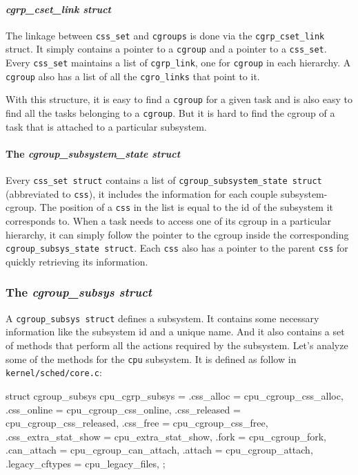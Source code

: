 \paragraph{\textit{cgrp\_cset\_link struct}}
The linkage between \verb|css_set| and \verb|cgroups| is done via the \verb|cgrp_cset_link| struct. It simply contains a pointer to a \verb|cgroup| and a pointer to a \verb|css_set|. Every \verb|css_set| maintains a list of \verb|cgrp_link|, one for \verb|cgroup| in each hierarchy. A \verb|cgroup| also has a list of all the \verb|cgro_links| that point to it. 

With this structure, it is easy to find a \verb|cgroup| for a given task and is also easy to find all the tasks belonging to a \verb|cgroup|. But it is hard to find the cgroup of a task that is attached to a particular subsystem.

\paragraph{The \textit{cgroup\_subsystem\_state struct}}
Every \verb|css_set struct| contains a list of \verb|cgroup_subsystem_state struct| (abbreviated to \verb|css|), it includes the information for each couple subsystem-cgroup.
The position of a \verb|css| in the list is equal to the id of the subsystem it corresponds to. When a task needs to access one of its cgroup in a particular hierarchy, it can simply follow the pointer to the cgroup inside the corresponding \verb|cgroup_subsys_state struct|. Each \verb|css| also has a pointer to the parent \verb|css| for quickly retrieving its information.

\subsubsection{The \textit{cgroup\_subsys struct}}
A \verb|cgroup_subsys struct| defines a subsystem. It contains some necessary information like the subsystem id and a unique name. And it also contains a set of methods that perform all the actions required by the subsystem. Let's analyze some of the methods for the \verb|cpu| subsystem. It is defined as follow in \verb|kernel/sched/core.c|:
\begin{code}
struct cgroup_subsys cpu_cgrp_subsys = {
	.css_alloc	= cpu_cgroup_css_alloc,
	.css_online	= cpu_cgroup_css_online,
	.css_released	= cpu_cgroup_css_released,
	.css_free	= cpu_cgroup_css_free,
	.css_extra_stat_show = cpu_extra_stat_show,
	.fork		= cpu_cgroup_fork,
	.can_attach	= cpu_cgroup_can_attach,
	.attach		= cpu_cgroup_attach,
	.legacy_cftypes	= cpu_legacy_files,
};
\end{code}
